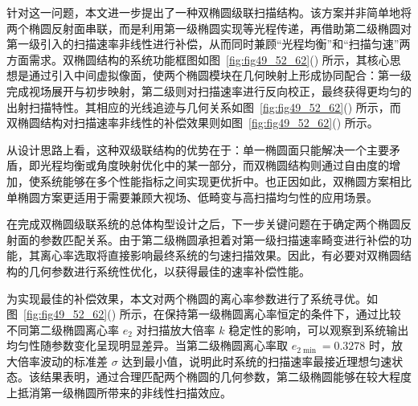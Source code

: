 针对这一问题，本文进一步提出了一种双椭圆级联扫描结构。该方案并非简单地将两个椭圆反射面串联，而是利用第一级椭圆实现等光程传递，再借助第二级椭圆对第一级引入的扫描速率非线性进行补偿，从而同时兼顾``光程均衡''和``扫描匀速''两方面需求。双椭圆结构的系统功能框图如图~\ref{fig:fig49_52_62}() 所示，其核心思想是通过引入中间虚拟像面，使两个椭圆模块在几何映射上形成协同配合：第一级完成视场展开与初步映射，第二级则对扫描速率进行反向校正，最终获得更均匀的出射扫描特性。其相应的光线追迹与几何关系如图~\ref{fig:fig49_52_62}() 所示，而双椭圆结构对扫描速率非线性的补偿效果则如图~\ref{fig:fig49_52_62}() 所示。

从设计思路上看，这种双级联结构的优势在于：单一椭圆面只能解决一个主要矛盾，即光程均衡或角度映射优化中的某一部分，而双椭圆结构则通过自由度的增加，使系统能够在多个性能指标之间实现更优折中。也正因如此，双椭圆方案相比单椭圆方案更适用于需要兼顾大视场、低畸变与高扫描均匀性的应用场景。

在完成双椭圆级联系统的总体构型设计之后，下一步关键问题在于确定两个椭圆反射面的参数匹配关系。由于第二级椭圆承担着对第一级扫描速率畸变进行补偿的功能，其离心率选取将直接影响最终系统的匀速扫描效果。因此，有必要对双椭圆结构的几何参数进行系统性优化，以获得最佳的速率补偿性能。

为实现最佳的补偿效果，本文对两个椭圆的离心率参数进行了系统寻优。如图~\ref{fig:fig49_52_62}() 所示，在保持第一级椭圆离心率恒定的条件下，通过比较不同第二级椭圆离心率 $e_2$ 对扫描放大倍率 $k$ 稳定性的影响，可以观察到系统输出均匀性随参数变化呈现明显差异。当第二级椭圆离心率取 $e_{2\min}=0.3278$ 时，放大倍率波动的标准差 $\sigma$ 达到最小值，说明此时系统的扫描速率最接近理想匀速状态。该结果表明，通过合理匹配两个椭圆的几何参数，第二级椭圆能够在较大程度上抵消第一级椭圆所带来的非线性扫描效应。

